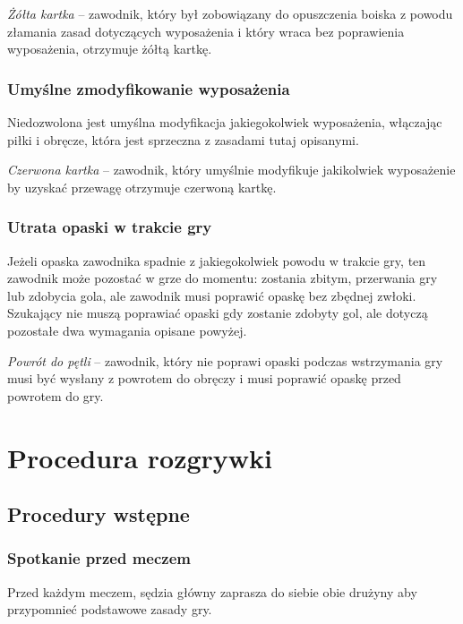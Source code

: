 \documentclass[12pt]{article}
\begin{document}
\emph{Żółta kartka} -- zawodnik, który był zobowiązany do opuszczenia
boiska z powodu złamania zasad dotyczących wyposażenia i który wraca bez
poprawienia wyposażenia, otrzymuje żółtą kartkę.

\subsubsection{Umyślne zmodyfikowanie wyposażenia}
Niedozwolona jest
umyślna modyfikacja jakiegokolwiek wyposażenia, włączając piłki i
obręcze, która jest sprzeczna z zasadami tutaj opisanymi.

\emph{Czerwona kartka} -- zawodnik, który umyślnie modyfikuje
jakikolwiek wyposażenie by uzyskać przewagę otrzymuje czerwoną kartkę.

\subsubsection{Utrata opaski w trakcie gry}
Jeżeli opaska zawodnika
spadnie z jakiegokolwiek powodu w trakcie gry, ten zawodnik może
pozostać w grze do momentu: zostania zbitym, przerwania gry lub zdobycia
gola, ale zawodnik musi poprawić opaskę bez zbędnej zwłoki. Szukający
nie muszą poprawiać opaski gdy zostanie zdobyty gol, ale dotyczą
pozostałe dwa wymagania opisane powyżej.

\emph{Powrót do pętli} -- zawodnik, który nie poprawi opaski podczas
wstrzymania gry musi być wysłany z powrotem do obręczy i musi poprawić
opaskę przed powrotem do gry.

\pagebreak
\section{Procedura rozgrywki}

\subsection{Procedury wstępne}

\subsubsection{Spotkanie przed meczem}
Przed każdym meczem, sędzia
główny zaprasza do siebie obie drużyny aby przypomnieć podstawowe zasady
gry.
\end{document}
